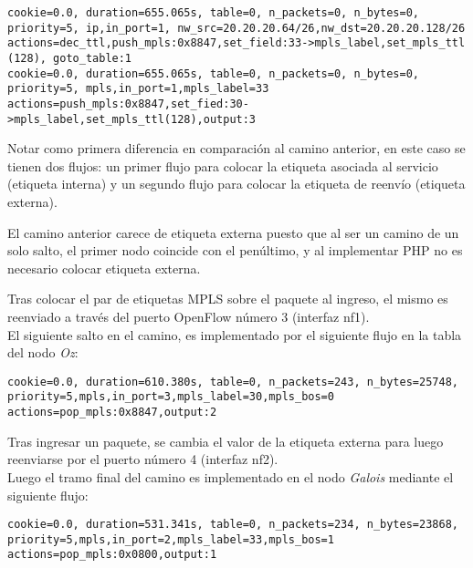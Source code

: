 \begin{center}
\texttt{cookie=0.0, duration=655.065s, table=0, n\_packets=0, n\_bytes=0, \\ 
priority=5, ip,in\_port=1, nw\_src=20.20.20.64/26,nw\_dst=20.20.20.128/26 \\
actions=dec\_ttl,push\_mpls:0x8847,set\_field:33->mpls\_label,set\_mpls\_ttl (128), goto\_table:1 \\
\vspace{0.5cm}
cookie=0.0, duration=655.065s, table=0, n\_packets=0, n\_bytes=0, \\ 
priority=5, mpls,in\_port=1,mpls\_label=33 \\
actions=push\_mpls:0x8847,set\_fied:30->mpls\_label,set\_mpls\_ttl(128),output:3
}
\end{center}

Notar como primera diferencia en comparación al camino anterior, en este caso se tienen dos flujos: un primer flujo para colocar la etiqueta asociada al servicio (etiqueta interna) y un segundo flujo para colocar la etiqueta de reenvío (etiqueta externa). 

El camino anterior carece de etiqueta externa puesto que al ser un camino de un solo salto, el primer nodo coincide con el pen\'ultimo, y al implementar PHP no es necesario colocar etiqueta externa. 

Tras colocar el par de etiquetas MPLS sobre el paquete al ingreso, el mismo es reenviado a trav\'es del puerto OpenFlow n\'umero 3 (interfaz nf1).\\

El siguiente salto en el camino, es implementado por el siguiente flujo en la tabla del nodo \textit{Oz}:

\begin{center}
\texttt{cookie=0.0, duration=610.380s, table=0, n\_packets=243, n\_bytes=25748, \\ 
priority=5,mpls,in\_port=3,mpls\_label=30,mpls\_bos=0 \\
actions=pop\_mpls:0x8847,output:2 }
\end{center}

Tras ingresar un paquete, se cambia el valor de la etiqueta externa para luego reenviarse por el puerto n\'umero 4 (interfaz nf2).\\

Luego el tramo final del camino es implementado en el nodo \textit{Galois} mediante el siguiente flujo:

\begin{center}
\texttt{cookie=0.0, duration=531.341s, table=0, n\_packets=234, n\_bytes=23868, \\
priority=5,mpls,in\_port=2,mpls\_label=33,mpls\_bos=1 \\
actions=pop\_mpls:0x0800,output:1 }
\end{center}


